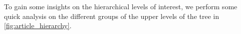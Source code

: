 

To gain some insights on the hierarchical levels of interest, we perform some quick analysis on the different groups of the upper levels of the tree in \autoref{fig:article_hierarchy}. \\
